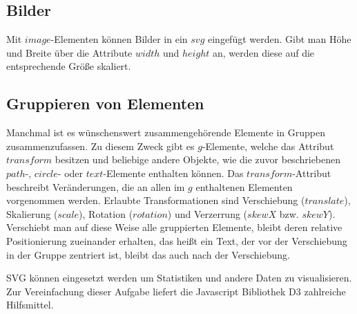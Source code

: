 \subsection{Bilder}
Mit $image$-Elementen können Bilder in ein $svg$ eingefügt werden. Gibt man Höhe und Breite über die Attribute $width$ und $height$ an, werden diese auf die entsprechende Größe skaliert.

\subsection{Gruppieren von Elementen}
Manchmal ist es wünschenswert zusammengehörende Elemente in Gruppen zusammenzufassen. Zu diesem Zweck gibt es $g$-Elemente, welche das Attribut $transform$ besitzen und beliebige andere Objekte, wie die zuvor beschriebenen $path$-, $circle$- oder $text$-Elemente enthalten können. Das $transform$-Attribut beschreibt Veränderungen, die an allen im $g$ enthaltenen Elementen vorgenommen werden. Erlaubte Transformationen sind  Verschiebung ($translate$), Skalierung ($scale$), Rotation ($rotation$) und Verzerrung ($skewX$ bzw. $skewY$). Verschiebt man auf diese Weise alle gruppierten Elemente, bleibt deren relative Positionierung zueinander erhalten, das heißt ein Text, der vor der Verschiebung in der Gruppe zentriert ist, bleibt das auch nach der Verschiebung.

SVG können eingesetzt werden um Statistiken und andere Daten zu visualisieren. Zur Vereinfachung dieser Aufgabe liefert die Javascript Bibliothek D3 zahlreiche Hilfsmittel.

